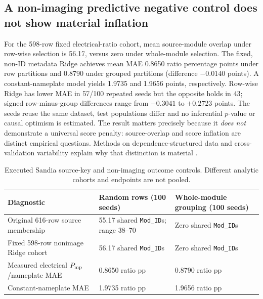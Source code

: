 \documentclass[10pt,a4paper]{article}
\begin{document}
\subsection{A non-imaging predictive negative control does not show material inflation}
For the 598-row fixed electrical-ratio cohort, mean source-module overlap under row-wise selection is 56.17, versus zero under whole-module selection. The fixed, non-ID metadata Ridge achieves mean MAE 0.8650 ratio percentage points under row partitions and 0.8790 under grouped partitions (difference $-0.0140$ points). A constant-nameplate model yields 1.9735 and 1.9656 points, respectively. Row-wise Ridge has lower MAE in 57/100 repeated seeds but the opposite holds in 43; signed row-minus-group differences range from $-0.3041$ to $+0.2723$ points. The seeds reuse the same dataset, test populations differ and no inferential $p$-value or causal optimism is estimated. The result matters precisely because it \emph{does not} demonstrate a universal score penalty: source-overlap and score inflation are distinct empirical questions. Methods on dependence-structured data and cross-validation variability explain why that distinction is material \cite{roberts2017,varoquaux2018}.

\begin{table}[ht]\centering\small
\caption{Executed Sandia source-key and non-imaging outcome controls. Different analytic cohorts and endpoints are not pooled.}
\begin{tabularx}{\linewidth}{@{}p{3.2cm}XX@{}}\toprule
Diagnostic & Random rows (100 seeds) & Whole-module grouping (100 seeds) \\ \midrule
Original 616-row source membership & 55.17 shared \texttt{Mod\_ID}s; range 38--70 & Zero shared \texttt{Mod\_ID}s \\
Fixed 598-row nonimage Ridge cohort & 56.17 shared \texttt{Mod\_ID}s & Zero shared \texttt{Mod\_ID}s \\
Measured electrical $P_{\rm mp}$/nameplate MAE & 0.8650 ratio pp & 0.8790 ratio pp \\
Constant-nameplate MAE & 1.9735 ratio pp & 1.9656 ratio pp \\
\bottomrule\end{tabularx}
\end{table}
\end{document}
